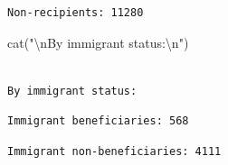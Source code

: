 \documentclass[
  letterpaper,
  DIV=11,
  numbers=noendperiod]{scrartcl}
\newenvironment{Shaded}{\begin{snugshade}}{\end{snugshade}}
\newcommand{\AttributeTok}[1]{\textcolor[rgb]{0.40,0.45,0.13}{#1}}
\newcommand{\ConstantTok}[1]{\textcolor[rgb]{0.56,0.35,0.01}{#1}}
\newcommand{\DecValTok}[1]{\textcolor[rgb]{0.68,0.00,0.00}{#1}}
\newcommand{\FunctionTok}[1]{\textcolor[rgb]{0.28,0.35,0.67}{#1}}
\newcommand{\NormalTok}[1]{\textcolor[rgb]{0.00,0.23,0.31}{#1}}
\newcommand{\SpecialCharTok}[1]{\textcolor[rgb]{0.37,0.37,0.37}{#1}}
\newcommand{\StringTok}[1]{\textcolor[rgb]{0.13,0.47,0.30}{#1}}
\begin{document}
\begin{verbatim}
Non-recipients: 11280 
\end{verbatim}

\begin{Shaded}
\begin{Highlighting}[]
\FunctionTok{cat}\NormalTok{(}\StringTok{"}\SpecialCharTok{\textbackslash{}n}\StringTok{By immigrant status:}\SpecialCharTok{\textbackslash{}n}\StringTok{"}\NormalTok{)}
\end{Highlighting}
\end{Shaded}

\begin{verbatim}

By immigrant status:
\end{verbatim}

\begin{Shaded}
\end{Shaded}

\begin{verbatim}
Immigrant beneficiaries: 568 
\end{verbatim}

\begin{Shaded}
\end{Shaded}

\begin{verbatim}
Immigrant non-beneficiaries: 4111 
\end{verbatim}
\end{document}
